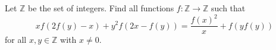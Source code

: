 Let $\mathbb{Z}$ be the set of integers. Find all functions $f : \mathbb{Z} \rightarrow \mathbb{Z}$ such that \[xf(2f(y)-x)+y^2f(2x-f(y))=\frac{f(x)^2}{x}+f(yf(y))\] for all $x, y \in \mathbb{Z}$ with $x \neq 0$.